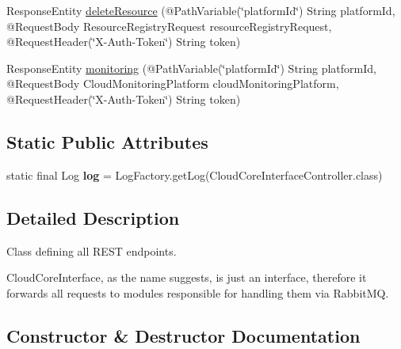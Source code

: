 \begin{DoxyCompactItemize}
\item 
Response\+Entity \hyperlink{classeu_1_1h2020_1_1symbiote_1_1controllers_1_1CloudCoreInterfaceController_a912389c96c1c458aca3b651c1d465cf4}{delete\+Resource} (@Path\+Variable(\char`\"{}platform\+Id\char`\"{}) String platform\+Id, @Request\+Body Resource\+Registry\+Request resource\+Registry\+Request, @Request\+Header(\char`\"{}X-\/Auth-\/Token\char`\"{}) String token)
\item 
Response\+Entity \hyperlink{classeu_1_1h2020_1_1symbiote_1_1controllers_1_1CloudCoreInterfaceController_a95c73970a1470bc27b74a6c9c059da00}{monitoring} (@Path\+Variable(\char`\"{}platform\+Id\char`\"{}) String platform\+Id, @Request\+Body Cloud\+Monitoring\+Platform cloud\+Monitoring\+Platform, @Request\+Header(\char`\"{}X-\/Auth-\/Token\char`\"{}) String token)
\end{DoxyCompactItemize}
\subsection*{Static Public Attributes}
\begin{DoxyCompactItemize}
\item 
\mbox{\label{classeu_1_1h2020_1_1symbiote_1_1controllers_1_1CloudCoreInterfaceController_ad8377d764953ae278312bad50e4e98fa}} 
static final Log {\bfseries log} = Log\+Factory.\+get\+Log(Cloud\+Core\+Interface\+Controller.\+class)
\end{DoxyCompactItemize}


\subsection{Detailed Description}
Class defining all R\+E\+ST endpoints. 

Cloud\+Core\+Interface, as the name suggests, is just an interface, therefore it forwards all requests to modules responsible for handling them via Rabbit\+MQ. 

\subsection{Constructor \& Destructor Documentation}
\mbox{\label{classeu_1_1h2020_1_1symbiote_1_1controllers_1_1CloudCoreInterfaceController_a19222abf4496aac62c037451b02c7f31}} 
